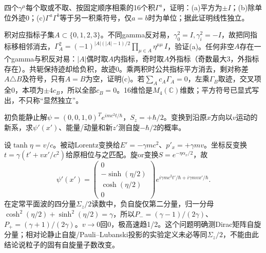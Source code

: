 \begin{exercise}
四个$\gamma^\mu$每个取或不取、按固定顺序相乘的16个积$\Gamma^a$，证明：(a)平方为$\pm I$；(b)除单位外迹0；(c)$\Gamma^a\Gamma^b$等于另一积乘符号，仅$a=b$时为单位；据此证明线性独立。
\end{exercise}
\begin{solution}
积对应指标子集$A\subset\{0,1,2,3\}$。不同gamma反对易，$\gamma_0^2=I,\gamma_i^2=-I$，故把同指标移相邻消去，$\Gamma_A^2=(-1)^{|A|(|A|-1)/2}\prod_{\mu\in A}\eta^{\mu\mu}\,I$，验证(a)。任何非空$A$存在一个gamma与积反对易：$|A|$偶时取$A$内指标，奇时取$A$外指标（奇数最大3，外指标存在）。共轭保持迹却给负积，故迹0。乘两积时公共指标平方消去，剩对称差$A\triangle B$及符号，只有$A=B$为空，证明(c)。若$\sum_Ac_A\Gamma_A=0$，左乘$\Gamma_B$取迹，交叉项全0，本项为$\pm4c_B$，所以全部$c_B=0$。16维恰是$M_4(\mathbb C)$维数；平方符号已显式写出，不只称“显然独立”。
\end{solution}

\begin{exercise}
初负能静止解$\psi=(0,0,1,0)^Te^{imc^2t/\hbar}$，$S_z=+\hbar/2$。变换到沿原$x$方向以$v$运动的新系，求$\psi'(x')$、能量/动量和新$z'$测自旋$-\hbar/2$的概率。
\end{exercise}
\begin{solution}
设$\tanh\eta=v/c$。被动Lorentz变换给$E'=-\gamma mc^2$、$p'_x=+\gamma mv$。坐标反变换$t=\gamma(t'+vx'/c^2)$给原相位与之匹配。旋or变换$S=e^{-\eta\alpha_x/2}$，故
\[
 \psi'(x')=\begin{pmatrix}0\\-\sinh(\eta/2)\\\cosh(\eta/2)\\0\end{pmatrix}
 e^{i\gamma mc^2t'/\hbar+i\gamma mvx'/\hbar}.
\]
在定常平面波的四分量$\Sigma_z/2$读数中，负自旋仅第二分量，归一分母$\cosh^2(\eta/2)+\sinh^2(\eta/2)=\gamma$，所以$P_-=(\gamma-1)/(2\gamma)$、$P_+=(\gamma+1)/(2\gamma)$。$v\to0$回0，极高速趋1/2。这个问题明确测Dirac矩阵自旋分量；相对论静止自旋/Pauli--Lubanski投影的实验定义未必等同$\Sigma_z/2$，不能由此结论说粒子的固有自旋量子数改变。
\end{solution}

